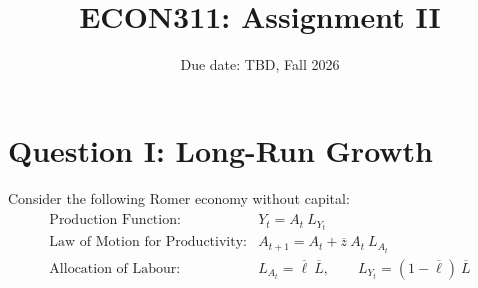 \documentclass[letterpaper,12pt]{article}
\title{\vspace{-.8in}ECON311: Assignment II}
\author{}
\date{Due date: TBD, Fall 2026}
\theoremstyle{dotlessS}
\begin{document}
\maketitle
\vspace{-.2in}


\section*{Question I: Long-Run Growth}
Consider the following Romer economy without capital:
\begin{eqnarray*}
\begin{array}{ll}
\text{Production Function:} & Y_t = A_t \: L_{Y_t} \\[1.4ex]
\text{Law of Motion for Productivity:} & A_{t+1} = A_t + \overline{z}\: A_t\: L_{A_t}  \\[1.4ex]
\text{Allocation of Labour:} & L_{A_t} = \overline{\ell}\:\overline{L}, \qquad L_{Y_t} = (1-\overline{\ell})\:\overline{L}  \\[1.4ex]
\end{array}
\end{eqnarray*}
\end{document}
